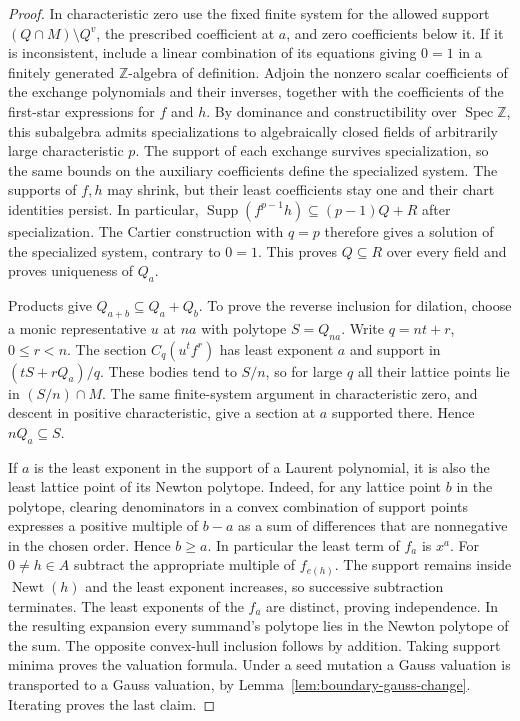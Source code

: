 \documentclass[11pt,reqno]{amsart}
\numberwithin{equation}{section}
\theoremstyle{definition}
\theoremstyle{remark}
\DeclareMathOperator{\Newt}{Newt}
\DeclareMathOperator{\Supp}{Supp}
\DeclareMathOperator{\Spec}{Spec}
\begin{document}
\begin{proof}
In characteristic zero use the fixed finite system for the allowed
support \((Q\cap M)\setminus Q^v\), the prescribed coefficient at
\(a\), and zero coefficients below it. If it is inconsistent,
include a linear combination of its equations giving \(0=1\)
in a finitely generated \(\mathbb Z\)-algebra of definition.
Adjoin the nonzero scalar coefficients of the exchange polynomials
and their inverses, together with the coefficients of the first-star
expressions for \(f\) and \(h\). By dominance and constructibility
over \(\Spec\mathbb Z\), this subalgebra admits specializations to
algebraically closed fields of arbitrarily large characteristic \(p\).
The support of each exchange survives specialization, so the same
bounds on the auxiliary coefficients define the specialized system.
The supports of \(f,h\) may shrink, but their least coefficients stay
one and their chart identities persist. In particular,
\(\Supp(f^{p-1}h)\subseteq (p-1)Q+R\) after specialization.
The Cartier construction with \(q=p\) therefore gives a solution of
the specialized system, contrary to \(0=1\). This proves \(Q\subseteq R\) over
every field and proves uniqueness of \(Q_a\).

Products give \(Q_{a+b}\subseteq Q_a+Q_b\). To prove the reverse
inclusion for dilation, choose a monic representative \(u\) at
\(na\) with polytope \(S=Q_{na}\). Write \(q=nt+r\),
\(0\le r<n\). The section \(C_q(u^t f^r)\) has least exponent
\(a\) and support in \((tS+rQ_a)/q\). These bodies tend to
\(S/n\), so for large \(q\) all their lattice points lie in
\((S/n)\cap M\). The same finite-system argument in characteristic
zero, and descent in positive characteristic, give a section at
\(a\) supported there. Hence \(nQ_a\subseteq S\).

If \(a\) is the least exponent in the support of a Laurent polynomial,
it is also the least lattice point of its Newton polytope. Indeed, for
any lattice point \(b\) in the polytope, clearing denominators in a
convex combination of support points expresses a positive multiple of
\(b-a\) as a sum of differences that are nonnegative in the chosen
order. Hence \(b\ge a\). In particular the least term of \(f_a\)
is \(x^a\). For \(0\ne h\in A\) subtract the appropriate multiple of
\(f_{e(h)}\). The support remains inside \(\Newt(h)\) and the
least exponent increases, so successive subtraction terminates.
The least exponents of the \(f_a\) are distinct, proving
independence. In the resulting expansion every summand's polytope
lies in the Newton polytope of the sum. The opposite convex-hull
inclusion follows by addition. Taking support minima proves the
valuation formula. Under a seed mutation a Gauss valuation is
transported to a Gauss valuation, by
Lemma~\ref{lem:boundary-gauss-change}. Iterating proves the last claim.
\end{proof}
\end{document}
